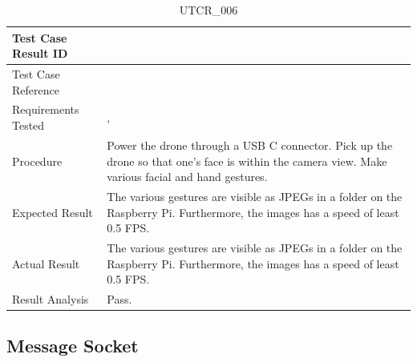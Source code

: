 \documentclass[12pt, titlepage]{article}
\begin{document}
\begin{table}[!h]
\begin{center}
\caption {UTCR\_006}
\label{tab:UTCR_006}
\begin{tabular}{ | m{3.2cm} | m{12.2cm} | } 
\hline
Test Case Result ID & \nameref{tab:UTCR_006} \\ 
\hline
Test Case Reference & \nameref{tab:UTC_006}  \\ 
\hline
Requirements Tested & \nameref{GEN_002}, \nameref{PERF_004} \\ 
\hline
Procedure & Power the drone through a USB C connector. Pick up the drone so that one's face is within the camera view. Make various facial and hand gestures. \\ 
\hline
Expected Result & The various gestures are visible as JPEGs in a folder on the Raspberry Pi. Furthermore, the images has a speed of least 0.5 FPS. \\ 
\hline
Actual Result & The various gestures are visible as JPEGs in a folder on the Raspberry Pi. Furthermore, the images has a speed of least 0.5 FPS. \\ 
\hline
Result Analysis & Pass. \\ 
\hline
\end{tabular}
\end{center}
\end{table}

\clearpage

\subsection{Message Socket}
\label{subsec:messageSocket}
\end{document}
